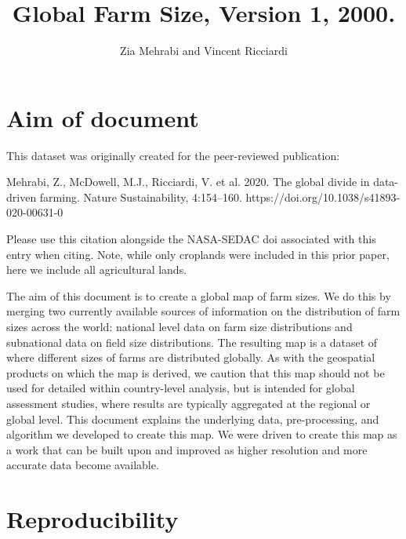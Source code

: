 \documentclass{article}\usepackage[]{graphicx}\usepackage[]{xcolor}
\title{Global Farm Size, Version 1, 2000.}
\author{Zia Mehrabi and Vincent Ricciardi}
\begin{document}






\maketitle

\tableofcontents

\newpage
\section{Aim of document}

This dataset was originally created for the peer-reviewed publication: 

Mehrabi, Z., McDowell, M.J., Ricciardi, V. et al. 2020. The global divide in data-driven farming. Nature Sustainability, 4:154–160. https://doi.org/10.1038/s41893-020-00631-0 \cite{Mehrabi}

Please use this citation alongside the NASA-SEDAC doi associated with this entry when citing. Note, while only croplands were included in this prior paper, here we include all agricultural lands. 

The aim of this document is to create a global map of farm sizes. We do this by merging two currently available sources of information on the distribution of farm sizes across the world: national level data on farm size distributions and subnational data on field size distributions. The resulting map is a dataset of where different sizes of farms are distributed globally. As with the geospatial products on which the map is derived, we caution that this map should not be used for detailed within country-level analysis, but is intended for global assessment studies, where results are typically aggregated at the regional or global level. This document explains the underlying data, pre-processing, and algorithm we developed to create this map. We were driven to create this map as a work that can be built upon and improved as higher resolution and more accurate data become available.


\section{Reproducibility}
\label{reproducibility}
\end{document}
